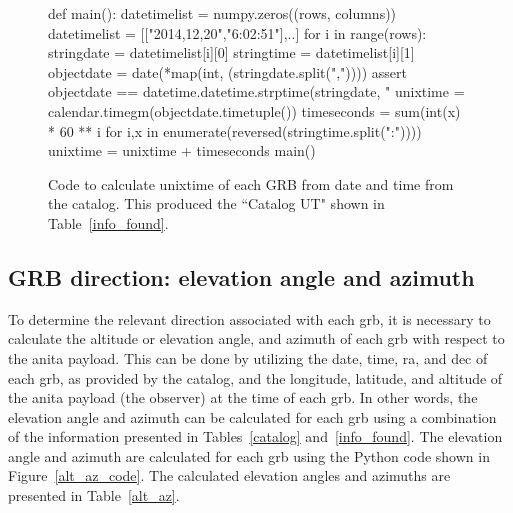 \begin{figure}
\centering
\begin{verbbox}
def main():
  datetimelist = numpy.zeros((rows, columns))
  datetimelist = [["2014,12,20","6:02:51"],..]
  for i in range(rows):
    stringdate = datetimelist[i][0]
    stringtime = datetimelist[i][1]
    objectdate = date(*map(int, (stringdate.split(","))))
    assert objectdate == 
    datetime.datetime.strptime(stringdate, "%
    unixtime = calendar.timegm(objectdate.timetuple())
    timeseconds = sum(int(x) * 60 ** i 
    for i,x in enumerate(reversed(stringtime.split(":"))))
    unixtime = unixtime + timeseconds
main()
\end{verbbox}
\fbox{\theverbbox}
\caption{Code to calculate unixtime of each GRB from date and time from the catalog. This produced the ``Catalog UT" shown in Table~\ref{info_found}.}
\label{unixtime_code}
\end{figure}


\subsection{GRB direction: elevation angle and azimuth}

To determine the relevant direction associated with each \gls{grb}, it is necessary to calculate the altitude or elevation angle, and azimuth of each \gls{grb} with respect to the \gls{anita} payload. This can be done by utilizing the date, time, \gls{ra}, and \gls{dec} of each \gls{grb}, as provided by the catalog, and the longitude, latitude, and altitude of the \gls{anita} payload (the observer) at the time of each \gls{grb}. 
In other words, the elevation angle and azimuth can be calculated for each \gls{grb} using a combination of the information presented in Tables~\ref{catalog} and~\ref{info_found}. 
The elevation angle and azimuth are calculated for each \gls{grb} using the Python code shown in Figure~\ref{alt_az_code}.
The calculated elevation angles and azimuths are presented in Table~\ref{alt_az}. 

